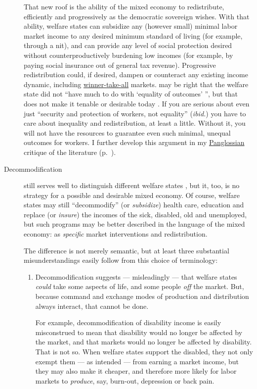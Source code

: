 \begin{description}
	That new roof is the ability of the mixed economy to redistribute, efficiently and progressively as the democratic sovereign wishes.
	With that ability, welfare states can subsidize any (however small) minimal labor market income to any desired minimum standard of living (for example, through a \gls{nit}), and can provide any level of social protection desired without counterproductively burdening low incomes (for example, by paying social insurance out of general tax revenue).
	Progressive redistribution could, if desired, dampen or counteract any existing income dynamic, including \hyperref[sec:winner-take-all]{winner-take-all} markets.
	\citeauthor{Offe2003} may be right that the welfare state did not ``have much to do with `equality of outcomes' '', but that does not make it tenable or desirable today \citeyearpar[450]{Offe2003}.
	If you are serious about even just ``security and protection of workers, not equality'' (\emph{ibid.}) you have to care about inequality and redistribution, at least a little.
	Without it, you will not have the resources to guarantee even such minimal, unequal outcomes for workers.
	I further develop this argument  in my \hyperref[sec:Pangloss]{Panglossian} critique of the literature (p.~\pageref{sec:Pangloss}).

	\item[Decommodification]
	still serves well to distinguish different welfare states \citep{Esping-Andersen-1990-aa}, but it, too, is no strategy for a possible and desirable mixed economy.
	Of course, welfare states may still ``decommodify'' (or \emph{subsidize}) health care, education and replace (or \emph{insure}) the incomes of the sick, disabled, old and unemployed, but such programs may be better described in the language of the mixed economy:
	as \emph{specific} market interventions and redistribution.

	The difference is not merely semantic, but at least three substantial misunderstandings easily follow from this choice of terminology:
	\begin{enumerate}
		\item Decommodification suggests --- misleadingly --- that welfare states \emph{could} take some aspects of life, and some people \emph{off} the market.
		But, because command and exchange modes of production and distribution always interact, that cannot be done.

		For example, decommodification of disability income is easily misconstrued to mean that disability would no longer be affected by the market, and that markets would no longer be affected by disability.
		That is not so.
		When welfare states support the disabled, they not only exempt them --- as intended --- from earning a market income, but they may also make it cheaper, and therefore more likely for labor markets to \emph{produce}, say, burn-out, depression or back pain.


\end{enumerate}
\end{description}
